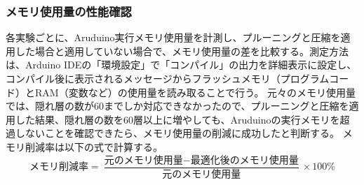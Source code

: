 \documentclass[uplatex,dvipdfmx]{jsarticle}
\begin{document}
\subsubsection{メモリ使用量の性能確認}
各実験ごとに、Aruduino実行メモリ使用量を計測し、プルーニングと圧縮を適用した場合と適用していない場合で、メモリ使用量の差を比較する。測定方法は、Arduino IDEの「環境設定」で「コンパイル」の出力を詳細表示に設定し、コンパイル後に表示されるメッセージからフラッシュメモリ（プログラムコード）とRAM（変数など）の使用量を読み取ることで行う。
元々のメモリ使用量では、隠れ層の数が60までしか対応できなかったので、プルーニングと圧縮を適用した結果、隠れ層の数を60層以上に増やしても、Aruduinoの実行メモリを超過しないことを確認できたら、メモリ使用量の削減に成功したと判断する。
メモリ削減率は以下の式で計算する。\\
\[
\text{メモリ削減率} = \frac{\text{元のメモリ使用量} - \text{最適化後のメモリ使用量}}{\text{元のメモリ使用量}} \times 100\%
\]
\end{document}
